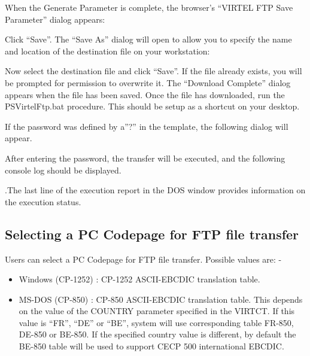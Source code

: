 \documentclass[letterpaper,10pt,english]{sphinxmanual}
\begin{document}
When the Generate Parameter is complete, the browser’s “VIRTEL FTP Save Parameter” dialog appears:



Click “Save”. The “Save As” dialog will open to allow you to specify the name and location of the destination file on your workstation:



Now select the destination file and click “Save”. If the file already exists, you will be prompted for permission to overwrite it. The “Download Complete” dialog appears when the file has been saved. Once the file has downloaded, run the PSVirtelFtp.bat procedure. This should be setup as a shortcut on your desktop.

If the password was defined by a”?” in the template, the following dialog will appear.



After entering the password, the transfer will be executed, and the following console log should be displayed.



.The last line of the execution report in the DOS window provides information on the execution status.


\subsection{Selecting a PC Codepage for FTP file transfer}
\label{\detokenize{Customization:selecting-a-pc-codepage-for-ftp-file-transfer}}
Users can select a PC Codepage for FTP file transfer. Possible values are: -
\begin{itemize}
\item {} 
Windows (CP-1252) : CP-1252 ASCII-EBCDIC translation table.

\item {} 
MS-DOS (CP-850) : CP-850 ASCII-EBCDIC translation table. This depends on the value of the COUNTRY parameter specified in the VIRTCT. If this value is “FR”, “DE” or “BE”, system will use corresponding table FR-850, DE-850 or BE-850. If the specified country value is different, by default the BE-850 table will be used to support CECP 500 international EBCDIC.

\end{itemize}
\end{document}
